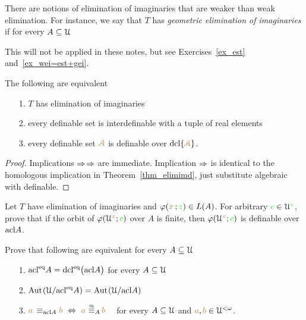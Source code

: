 There are notions of elimination of imaginaries that are weaker than weak elimination.
For instance, we say that $T$ has \emph{geometric elimination of imaginaries\/} if for every $A\subseteq\EuScript U$

\ceq{\hfill {\vl\Aa} }{\in}{{\acl}^\eq\big(\acl\{{\vl\Aa}\}\big)}

This will not  be applied in these notes, but see Exercises~\ref{ex_est} and~\ref{ex_wei=est+gei}.

\begin{theorem}\label{elimimf} 
The following are equivalent
\begin{itemize}
\item[1.] $T$ has elimination of imaginaries
\item[2.] every definable set is interdefinable with a tuple of real elements
\item[3.] every definable set ${\color{brown}\EuScript A}$ is definable over ${\rm dcl}\{{\color{brown}\EuScript A}\}$.
\end{itemize}
\end{theorem}

\begin{proof}
Implications $\Rightarrow$$\Rightarrow$ are immediate.
Implication $\Rightarrow$ is identical to the homologous implication in Theorem~\ref{thm_elimimd}, just substitute algebraic with definable.
\end{proof}



\begin{exercise}
  Let $T$ have elimination of imaginaries and $\varphi({\color{brown} x}\,;{\color{green} z})\in L(A)$.
  For arbitrary ${\color{green} c}\in\EuScript U^{\color{green} z}$, prove that if the orbit of $\varphi(\EuScript U^{\color{brown} x}; {\color{green} c})$ over $A$ is finite, then $\varphi(\EuScript U^{\color{brown} x}; {\color{green} c})$ is definable over ${\rm acl} A$.
  \end{exercise}
  
  
  \begin{exercise}\label{ex_est}
    Prove that following are equivalent for every $A\subseteq\EuScript U$
    \begin{itemize}
    \item[1.]  ${\rm acl}^{{\rm eq}} A={\rm dcl}^{{\rm eq}}\big({\rm acl} A\big)$ for every $A\subseteq\EuScript U$
    \item[2.]  ${\rm Aut\kern.15ex}(\EuScript U/{\rm acl}^{{\rm eq}} A)= {\rm Aut\kern.15ex}(\EuScript U/{\rm acl} A)$
    \item[3.] ${\mr a}\,\equiv_{\acl A}{\mr b}\ \IFF\ {\mr a}\ \smash{\equivSh_A}\, {\mr b}$ \ \ for every $A\subseteq\EuScript U$ and  ${\color{brown} a},{\color{brown} b}\in\EuScript U^{<\omega}$.
    \end{itemize} 
  \end{exercise}
  
